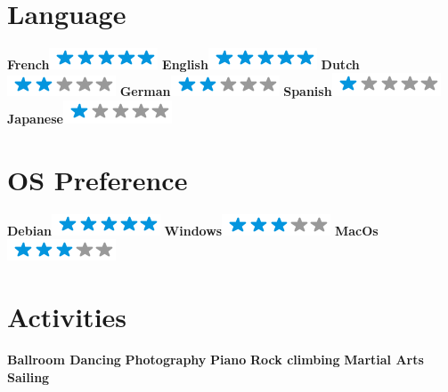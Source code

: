 \begin{aside}
  ~
  \makecvsideheader%
  \section{Language}
  \textbf{French}\includegraphics[scale=0.40]{img/5stars.png}
  \textbf{English}\includegraphics[scale=0.40]{img/5stars.png}
  \textbf{Dutch}\includegraphics[scale=0.40]{img/2stars.png}
  \textbf{German}\includegraphics[scale=0.40]{img/2stars.png}
  \textbf{Spanish}\includegraphics[scale=0.40]{img/1stars.png}
  \textbf{Japanese}\includegraphics[scale=0.40]{img/1stars.png}
  ~
  \section{OS Preference}
  \textbf{Debian}\includegraphics[scale=0.40]{img/5stars.png}
  \textbf{Windows}\includegraphics[scale=0.40]{img/3stars.png}
  \textbf{MacOs}\includegraphics[scale=0.40]{img/3stars.png}
  ~
  \section{Activities}
  \textbf{Ballroom Dancing}
  \textbf{Photography}
  \textbf{Piano}
  \textbf{Rock climbing}
  \textbf{Martial Arts}
  \textbf{Sailing}
\end{aside}
